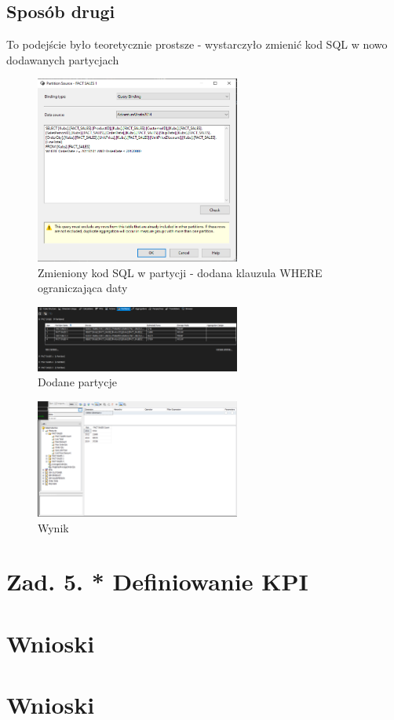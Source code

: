 \documentclass[a4paper,12pt]{article}
\begin{document}
\subsection{Sposób drugi}

To podejście było teoretycznie prostsze - wystarczyło zmienić kod SQL w nowo dodawanych partycjach

\begin{figure}[H]
  \includegraphics[width=0.6\textwidth]{images/4b_source.png}
  \caption{Zmieniony kod SQL w partycji - dodana klauzula WHERE ograniczająca daty}
\end{figure}

\begin{figure}[H]
  \includegraphics[width=0.6\textwidth]{images/4b.png}
  \caption{Dodane partycje}
\end{figure}

\begin{figure}[H]
  \includegraphics[width=0.6\textwidth]{images/4a_result.png}
  \caption{Wynik}
\end{figure}

\section{Zad. 5. * Definiowanie KPI}
\section{Wnioski}

\section{Wnioski}

\printbibliography
\end{document}
